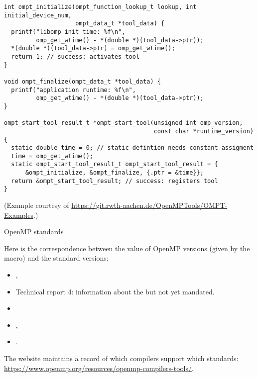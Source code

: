 \begin{lstlisting}
int ompt_initialize(ompt_function_lookup_t lookup, int initial_device_num,
                    ompt_data_t *tool_data) {
  printf("libomp init time: %f\n",
         omp_get_wtime() - *(double *)(tool_data->ptr));
  *(double *)(tool_data->ptr) = omp_get_wtime();
  return 1; // success: activates tool
}

void ompt_finalize(ompt_data_t *tool_data) {
  printf("application runtime: %f\n",
         omp_get_wtime() - *(double *)(tool_data->ptr));
}

ompt_start_tool_result_t *ompt_start_tool(unsigned int omp_version,
                                          const char *runtime_version) {
  static double time = 0; // static defintion needs constant assigment
  time = omp_get_wtime();
  static ompt_start_tool_result_t ompt_start_tool_result = {
      &ompt_initialize, &ompt_finalize, {.ptr = &time}};
  return &ompt_start_tool_result; // success: registers tool
}  
\end{lstlisting}
(Example courtesy of \url{https://git.rwth-aachen.de/OpenMPTools/OMPT-Examples}.)

 {OpenMP standards}
\label{sec:omp-standards}

Here is the correspondence between the value of OpenMP versions
(given by the  macro)
and the standard versions:

\begin{multicols}{2}
  \begin{itemize}
  \item {} ,
  \item {} Technical report 4: information about the 
    but not yet mandated.
  \item {} 
  \item {} ,
  \item {} .
  \end{itemize}
  \columnbreak
\end{multicols}

The  website maintains a record of which compilers
support which standards: \url{https://www.openmp.org/resources/openmp-compilers-tools/}.
